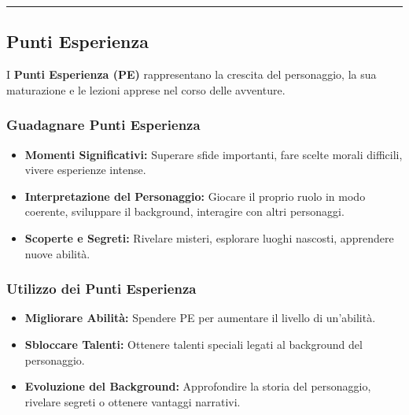 \documentclass[../manuale_main.tex]{subfiles}
\begin{document}
\vspace{0.5cm}
\rule{\textwidth}{0.4pt}
\vspace{0.5cm}

\subsection{Punti Esperienza}
I \textbf{Punti Esperienza (PE)} rappresentano la crescita del personaggio, la sua maturazione e le lezioni apprese nel corso delle avventure.

\subsubsection{Guadagnare Punti Esperienza}
\begin{itemize}
    \item \textbf{Momenti Significativi:} Superare sfide importanti, fare scelte morali difficili, vivere esperienze intense.
    \item \textbf{Interpretazione del Personaggio:} Giocare il proprio ruolo in modo coerente, sviluppare il background, interagire con altri personaggi.
    \item \textbf{Scoperte e Segreti:} Rivelare misteri, esplorare luoghi nascosti, apprendere nuove abilità.
\end{itemize}

\subsubsection{Utilizzo dei Punti Esperienza}
\begin{itemize}
    \item \textbf{Migliorare Abilità:} Spendere PE per aumentare il livello di un'abilità.
    \item \textbf{Sbloccare Talenti:} Ottenere talenti speciali legati al background del personaggio.
    \item \textbf{Evoluzione del Background:} Approfondire la storia del personaggio, rivelare segreti o ottenere vantaggi narrativi.
\end{itemize}
\end{document}

